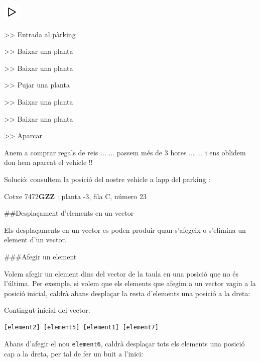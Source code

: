 \documentclass[]{book}
\newenvironment{Shaded}{\begin{snugshade}}{\end{snugshade}}
\newcommand{\DecValTok}[1]{\textcolor[rgb]{0.00,0.00,0.81}{#1}}
\newcommand{\ErrorTok}[1]{\textcolor[rgb]{0.64,0.00,0.00}{\textbf{#1}}}
\newcommand{\NormalTok}[1]{#1}
\begin{document}
\includegraphics{./img/play.png}

\begin{Shaded}
\begin{Highlighting}[]
\NormalTok{\textgreater{}\textgreater{} Entrada al pàrking }

\NormalTok{\textgreater{}\textgreater{} Baixar una planta}

\NormalTok{\textgreater{}\textgreater{} Baixar una planta}

\NormalTok{\textgreater{}\textgreater{} Pujar una planta}

\NormalTok{\textgreater{}\textgreater{} Baixar una planta}

\NormalTok{\textgreater{}\textgreater{} Baixar una planta}

\NormalTok{\textgreater{}\textgreater{} Aparcar}

\NormalTok{Anem a comprar regals de reis ...}
\NormalTok{... passem més de }\DecValTok{3}\NormalTok{ hores ...}
\NormalTok{... i ens oblidem d\textquotesingle{}on hem aparcat el vehicle !!}

\NormalTok{Solució: consultem la posició del nostre vehicle }
\NormalTok{a l\textquotesingle{}app del parking : }

\NormalTok{Cotxe }\DecValTok{7472}\ErrorTok{GZZ}\NormalTok{ : planta {-}}\DecValTok{3}\NormalTok{, fila C, número }\DecValTok{23}
\end{Highlighting}
\end{Shaded}

\#\#Desplaçament d'elements en un vector

Els desplaçaments en un vector es poden produir quan s'afegeix o s'elimina un element d'un vector.

\#\#\#Afegir un element

Volem afegir un element dins del vector de la taula en una posició que no és l'última. Per exemple, si volem que els elements que afegim a un vector vagin a la posició inicial, caldrà abans desplaçar la resta d'elements una posició a la dreta:

Contingut inicial del vector:

\begin{verbatim}
[element2] [element5] [element1] [element7]
\end{verbatim}

Abans d'afegir el nou \texttt{element6}, caldrà desplaçar tots els elements una posició cap a la dreta, per tal de fer un buit a l'inici:
\end{document}
